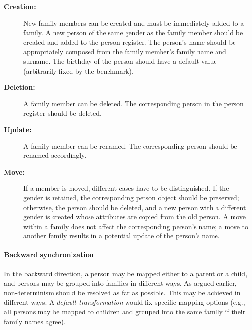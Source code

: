 \begin{description}
    \item[\textbf{Creation:}]
    New family members can be created and must be immediately added to a family.
    A new person of the same gender as the family member should be created and added to the person register.
    The person's name should be appropriately composed from the family member's family name and surname.
    The birthday of the person should have a default value (arbitrarily fixed by the benchmark). 
    
    \item[\textbf{Deletion:}]
    A family member can be deleted.  The corresponding person in the person register should be deleted.
    
    \item[\textbf{Update:}]
    A family member can be renamed.  The corresponding person should be renamed accordingly.
    
    \item[\textbf{Move:}]
    If a member is moved, different cases have to be distinguished.
    If the gender is retained, the corresponding person object should be preserved; otherwise, the person should be deleted, and a new person with a different gender is created whose attributes are copied from the old person. 
    A move within a family does not affect the corresponding person's name; a move to another family results in a potential update of the person's name.
\end{description}


\paragraph{Backward synchronization}

In the backward direction, a person may be mapped either to a parent or a child, and persons may be grouped into families in different ways. As argued earlier, non-determinism should be resolved as far as possible. This may be achieved in different ways. A \emph{default transformation} would fix specific mapping options (e.g., all persons may be mapped to children and grouped into the same family if their family names agree). 




